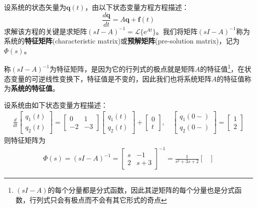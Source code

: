 \begin{definition}
    设系统的状态矢量为$\mathbf{q}(t)$，由以下状态变量方程方程描述：
    $$\frac{d\mathbf{q}}{dt}=A\mathbf{q}+\mathbf{f}(t)$$
    求解该方程的关键是求矩阵$(sI-A)^{-1}=\mathcal{L}\{\mathrm{e}^{At}\}$。我们将矩阵$(sI-A)^{-1}$称为系统的\textbf{特征矩阵}(characteristic matrix)或\textbf{预解矩阵}(pre-solution matrix)，记为$\Phi(s)$。
\end{definition}

称$(sI-A)^{-1}$为特征矩阵，是因为它的行列式的极点就是矩阵$A$的特征值\footnote{$(sI-A)$的每个分量都是分式函数，因此其逆矩阵的每个分量也是分式函数，行列式只会有极点而不会有其它形式的奇点}，在状态变量的可逆线性变换下，特征值是不变的，因此我们也将系统矩阵$A$的特征值称为\textbf{系统的特征值}。

\begin{example}
    设系统由如下状态变量方程描述：
    \begin{align*}
        \frac{d}{dt}\begin{bmatrix}
            q_1(t)\\
            q_2(t)
        \end{bmatrix}=\begin{bmatrix}
            0 & 1\\
            -2 & -3
        \end{bmatrix}\begin{bmatrix}
            q_1(t)\\
            q_2(t)
        \end{bmatrix}+\begin{bmatrix}
            0\\
            t
        \end{bmatrix},\quad\begin{bmatrix}
            q_1(0-)\\
            q_2(0-)
        \end{bmatrix}=\begin{bmatrix}
            1\\
            2
        \end{bmatrix}
    \end{align*}
    则特征矩阵为\begin{align*}
        \Phi(s)=(sI-A)^{-1}=\begin{bmatrix}
            s & -1\\
            2 & s+3
        \end{bmatrix}^{-1}=\frac{1}{s^2+3s+2}\begin{bmatrix}

\end{bmatrix}
\end{align*}
\end{example}
